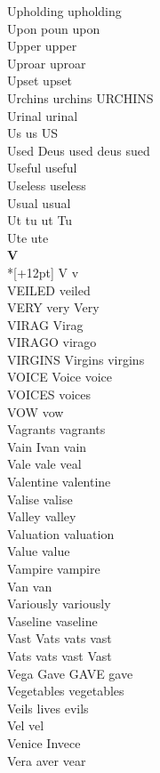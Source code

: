Upholding upholding\\
Upon poun upon\\
Upper upper\\
Uproar uproar\\
Upset upset\\
Urchins urchins URCHINS\\
Urinal urinal\\
Us us US\\
Used Deus used deus sued\\
Useful useful\\
Useless useless\\
Usual usual\\
Ut tu ut Tu\\
Ute ute\\

\vspace{14pt}
\noindent\textbf{\Large V}\\*[+12pt]
V v\\
VEILED veiled\\
VERY very Very\\
VIRAG Virag\\
VIRAGO virago\\
VIRGINS Virgins virgins\\
VOICE Voice voice\\
VOICES voices\\
VOW vow\\
Vagrants vagrants\\
Vain Ivan vain\\
Vale vale veal\\
Valentine valentine\\
Valise valise\\
Valley valley\\
Valuation valuation\\
Value value\\
Vampire vampire\\
Van van\\
Variously variously\\
Vaseline vaseline\\
Vast Vats vats vast\\
Vats vats vast Vast\\
Vega Gave GAVE gave\\
Vegetables vegetables\\
Veils lives evils\\
Vel vel\\
Venice Invece\\
Vera aver vear\\
